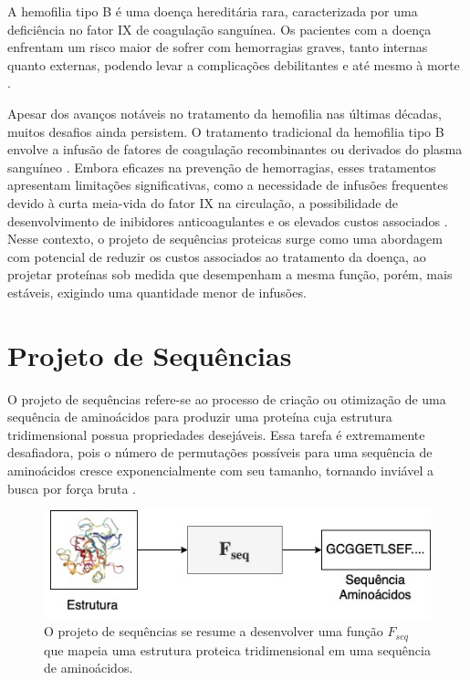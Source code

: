 \label{cap:introducao}
\enlargethispage{.5\baselineskip}

A hemofilia tipo B é uma doença hereditária rara, 
caracterizada por uma deficiência no fator IX de coagulação sanguínea. 
Os pacientes com a doença enfrentam um risco maior de sofrer com hemorragias graves, 
tanto internas quanto externas, 
podendo levar a complicações debilitantes e até mesmo à morte \cite{Mannucci}.

Apesar dos avanços notáveis no tratamento da hemofilia nas últimas décadas,
muitos desafios ainda persistem.
O tratamento tradicional da hemofilia tipo B envolve a infusão de fatores de coagulação recombinantes
ou derivados do plasma sanguíneo \cite{Gouw}. 
Embora eficazes na prevenção de hemorragias,
esses tratamentos apresentam limitações significativas,
como a necessidade de infusões frequentes devido à curta meia-vida do fator IX na circulação,
a possibilidade de desenvolvimento de inibidores anticoagulantes e os elevados custos associados \cite{Mancuso}.
Nesse contexto, o projeto de sequências proteicas surge 
como uma abordagem com potencial de reduzir os custos associados ao tratamento da doença, 
ao projetar proteínas sob medida que desempenham a mesma função, porém, mais estáveis, 
exigindo uma quantidade menor de infusões.

\section{Projeto de Sequências}

O projeto de sequências refere-se ao processo de criação ou
otimização de uma sequência de aminoácidos para produzir uma proteína
cuja estrutura tridimensional possua propriedades desejáveis.
Essa tarefa é extremamente desafiadora, 
pois o número de permutações possíveis para uma sequência de aminoácidos
cresce exponencialmente com seu tamanho, 
tornando inviável a busca por força bruta \cite{Overview}.

\begin{figure}[H]
  \centering
  \includegraphics[width=.8\textwidth]{figuras/metodologia-SeqDes.jpg}
  \caption{O projeto de sequências se resume a desenvolver uma 
           função $F_{seq}$ que mapeia uma estrutura proteica tridimensional em uma sequência de aminoácidos.}
\end{figure}

